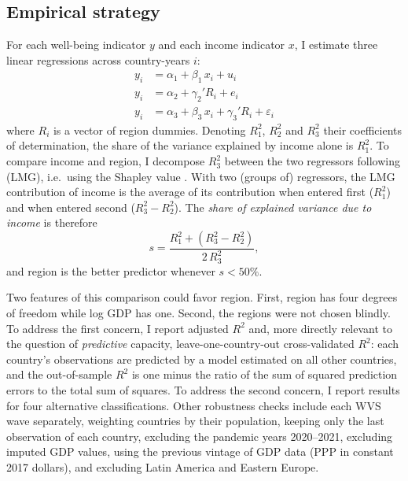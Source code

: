 \subsection{Empirical strategy}\label{subsec:method_region}

For each well-being indicator $y$ and each income indicator $x$, I estimate three linear regressions across country-years $i$:
\begin{align}
    y_i &= \alpha_1 + \beta_1\, x_i + u_i \label{eq:income}\\
    y_i &= \alpha_2 + \gamma_2' R_i + e_i \label{eq:region}\\
    y_i &= \alpha_3 + \beta_3\, x_i + \gamma_3' R_i + \varepsilon_i \label{eq:both}
\end{align}
where $R_i$ is a vector of region dummies. Denoting $R^2_1$, $R^2_2$ and $R^2_3$ their coefficients of determination, the share of the variance explained by income alone is $R^2_1$. To compare income and region, I decompose $R^2_3$ between the two regressors following \citet{lindeman_introduction_1980} (LMG), i.e.\ using the Shapley value \citep{gromping_estimators_2007}. With two (groups of) regressors, the LMG contribution of income is the average of its contribution when entered first ($R^2_1$) and when entered second ($R^2_3 - R^2_2$). The \textit{share of explained variance due to income} is therefore
\begin{equation}
    s = \frac{R^2_1 + (R^2_3 - R^2_2)}{2\, R^2_3}, \label{eq:share}
\end{equation}
and region is the better predictor whenever $s < 50\%$.

Two features of this comparison could favor region. First, region has four degrees of freedom while log GDP has one. Second, the regions were not chosen blindly. To address the first concern, I report adjusted $R^2$ and, more directly relevant to the question of \textit{predictive} capacity, leave-one-country-out cross-validated $R^2$: each country's observations are predicted by a model estimated on all other countries, and the out-of-sample $R^2$ is one minus the ratio of the sum of squared prediction errors to the total sum of squares. To address the second concern, I report results for four alternative classifications. Other robustness checks include each WVS wave separately, weighting countries by their population, keeping only the last observation of each country, excluding the pandemic years 2020--2021, excluding imputed GDP values, using the previous vintage of GDP data (PPP in constant 2017 dollars), and excluding Latin America and Eastern Europe.

